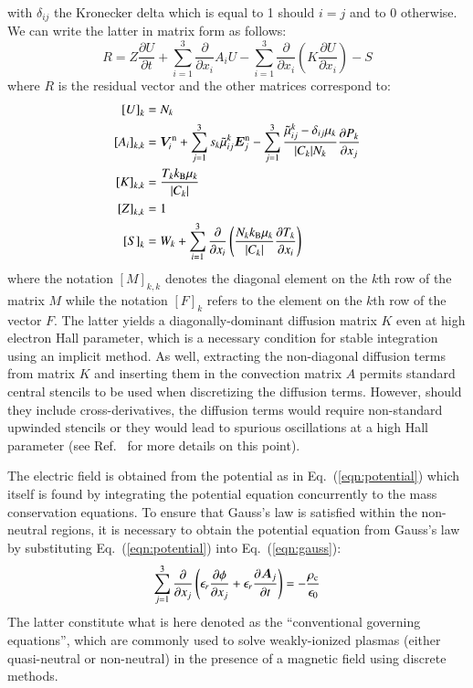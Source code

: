 \documentclass{warpdoc}
\newcommand{\alb}{\vspace{0.1cm}\\} %
\newcommand{\nd}{3}
\renewcommand{\vec}[1]{\bm{#1}}
\begin{document}
%
with $\delta_{ij}$ the Kronecker delta which is equal to 1 should $i=j$ and to 0 otherwise. We can write the latter in matrix form as follows:
%
\begin{equation}
 R = Z \frac{\partial U}{\partial t} + \sum_{i=1}^3 \frac{\partial}{\partial x_i} A_i U  - \sum_{i=1}^3  \frac{\partial}{\partial x_i}  \left( K \frac{\partial U}{\partial x_i}\right)  -S
\end{equation}
%
where $R$ is the residual vector and the other matrices correspond to:
%
\begin{align}
 \left[U\right]_k&=N_k \alb
 \left[A_i\right]_{k,k} &= \vec{V}^{\rm n}_i+\sum_{j=1}^\nd s_k \wtilde{\mu}^k_{ij}  \vec{E}_j^{\rm n}
             - \sum_{j=1}^\nd  \frac{\wtilde{\mu}^{k}_{ij}-\delta_{ij} \mu_k}{|C_k| N_k} \frac{\partial P_k}{\partial x_j}  \alb
 \left[K\right]_{k,k} &= \frac{T_k k_{\rm B} \mu_k}{|C_k|} \alb
 \left[Z\right]_{k,k} &= 1 \alb
 \left[S\right]_k &=W_k+
\sum_{i=1}^3 \frac{\partial}{\partial x_i} \left(\frac{N_k k_{\rm B} \mu_k}{|C_k| } \frac{\partial T_k}{\partial x_i}
\right) 
\end{align}
%
where the notation $[M]_{k,k}$ denotes the diagonal element on the $k$th row of the matrix $M$ while the notation $[F]_k$ refers to the element on the $k$th row of the vector $F$. The latter yields a diagonally-dominant diffusion matrix $K$ even at high electron Hall parameter, which is a necessary condition for stable integration using an implicit method. As well, extracting the non-diagonal diffusion terms from matrix $K$ and inserting them in the convection matrix $A$ permits standard central stencils to be used when discretizing the diffusion terms. However, should they include cross-derivatives, the diffusion terms would require non-standard upwinded stencils or they would lead to spurious oscillations at a high Hall parameter (see Ref.\ \cite{jcp:2011:parent} for more details on this point).   

The electric field is obtained from the potential as in Eq.\ (\ref{eqn:potential}) which itself is found by integrating the potential equation concurrently to the mass conservation equations. To ensure that Gauss's law is satisfied within the non-neutral regions, it is necessary to obtain the potential equation from Gauss's law by substituting Eq.\ (\ref{eqn:potential}) into Eq.\ (\ref{eqn:gauss}):
%
\begin{equation}
\sum_{j=1}^3 \frac{\partial }{\partial x_j}\left(\epsilon_r \frac{\partial \phi}{\partial x_j} + \epsilon_r \frac{\partial \vec{A}_j}{\partial t}\right)=-\frac{\rho_{\rm c}}{\epsilon_0}  
\label{eqn:potentialgauss}
\end{equation}
%  
The latter constitute what is here denoted as the ``conventional governing equations'', which are commonly used to solve weakly-ionized plasmas (either quasi-neutral or non-neutral) in the presence of a magnetic field using discrete methods.
\end{document}

